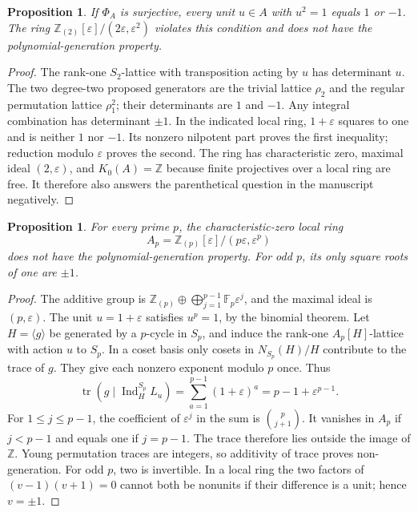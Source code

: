 \documentclass[11pt,a4paper]{article}
\newtheorem{proposition}[theorem]{Proposition}
\theoremstyle{definition}\newtheorem{definition}[theorem]{Definition}
\theoremstyle{remark}\newtheorem{remark}[theorem]{Remark}
\newcommand{\Z}{\mathbb Z}\newcommand{\Q}{\mathbb Q}
\newcommand{\F}{\mathbb F}\newcommand{\Lat}{\operatorname{Lat}}
\newcommand{\tr}{\operatorname{tr}}\newcommand{\Pic}{\operatorname{Pic}}
\begin{document}
\begin{proposition}\label{prop:determinant}
If $\Phi_A$ is surjective, every unit $u\in A$ with $u^2=1$
equals $1$ or $-1$.  The ring
$\Z_{(2)}[\varepsilon]/(2\varepsilon,\varepsilon^2)$ violates this
condition and does not have the polynomial-generation property.
\end{proposition}
\begin{proof}
The rank-one $S_2$-lattice with transposition acting by $u$ has
determinant $u$.  The two degree-two proposed generators are the
trivial lattice $\rho_2$ and the regular permutation lattice
$\rho_1^2$; their determinants are $1$ and $-1$.  Any integral
combination has determinant $\pm1$.
In the indicated local ring, $1+\varepsilon$ squares to one and
is neither $1$ nor $-1$.  Its nonzero nilpotent part proves the
first inequality; reduction modulo $\varepsilon$ proves the
second.  The ring has characteristic zero, maximal ideal
$(2,\varepsilon)$, and $K_0(A)=\Z$ because finite projectives over
a local ring are free.  It therefore also answers the
parenthetical question in the manuscript negatively.
\end{proof}

\begin{proposition}\label{prop:nilpotent-trace}
For every prime $p$, the characteristic-zero local ring
\[
 A_p=\Z_{(p)}[\varepsilon]/(p\varepsilon,\varepsilon^p)
\]
does not have the polynomial-generation property.  For odd $p$,
its only square roots of one are $\pm1$.
\end{proposition}
\begin{proof}
The additive group is
$\Z_{(p)}\oplus\bigoplus_{j=1}^{p-1}\F_p\varepsilon^j$,
and the maximal ideal is $(p,\varepsilon)$.  The unit
$u=1+\varepsilon$ satisfies $u^p=1$, by the binomial theorem.
Let $H=\langle g\rangle$ be generated by a $p$-cycle in $S_p$,
and induce the rank-one $A_p[H]$-lattice with action $u$ to $S_p$.
In a coset basis only cosets in $N_{S_p}(H)/H$ contribute to the
trace of $g$.  They give each nonzero exponent modulo $p$ once.
Thus
\[
 \tr(g\mid\operatorname{Ind}_H^{S_p}L_u)
  =\sum_{a=1}^{p-1}(1+\varepsilon)^a
  =p-1+\varepsilon^{p-1}.
\]
For $1\leq j\leq p-1$, the coefficient of $\varepsilon^j$
in the sum is $\binom p{j+1}$.  It vanishes in $A_p$ if
$j<p-1$ and equals one if $j=p-1$.  The trace therefore lies
outside the image of $\Z$.  Young permutation traces are integers,
so additivity of trace proves non-generation.
For odd $p$, two is invertible.  In a local ring the two factors
of $(v-1)(v+1)=0$ cannot both be nonunits if their difference is
a unit; hence $v=\pm1$.
\end{proof}
\end{document}
